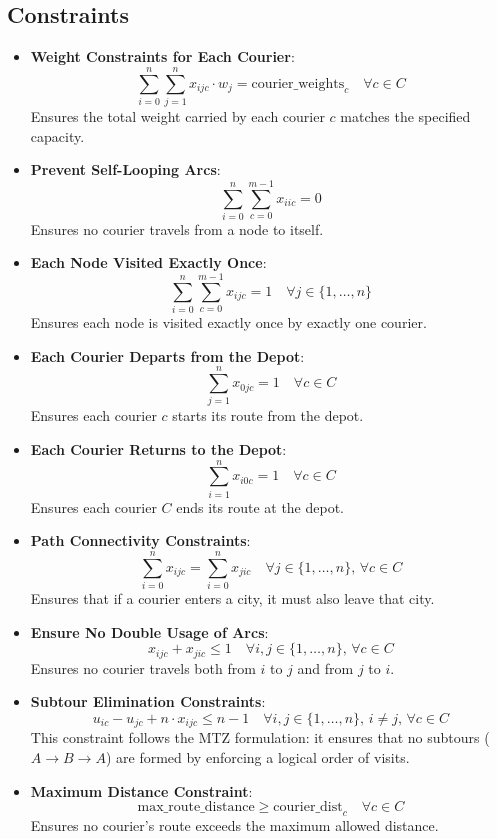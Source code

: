 \subsection{Constraints}

\begin{itemize}
 


   \item  \textbf{Weight Constraints for Each Courier}:
   \[
   \sum_{i=0}^n \sum_{j=1}^n x_{ijc} \cdot w_j
 = \text{courier\_weights}_c \quad \forall c \in C
   \]
   Ensures the total weight carried by each courier \( c \) matches the specified capacity.

\item  \textbf{Prevent Self-Looping Arcs}:
   \[
   \sum_{i=0}^n \sum_{c=0}^{m-1} x_{iic} = 0
   \]
   Ensures no courier travels from a node to itself.

\item  \textbf{Each Node Visited Exactly Once}:
   \[
   \sum_{i=0}^n \sum_{c=0}^{m-1} x_{ijc} = 1 \quad \forall j \in \{1, \dots, n\}
   \]
   Ensures each node is visited exactly once by exactly one courier.

\item  \textbf{Each Courier Departs from the Depot}:
   \[
   \sum_{j=1}^n x_{0jc} = 1 \quad \forall c \in C
   \]
   Ensures each courier \( c \) starts its route from the depot.

\item  \textbf{Each Courier Returns to the Depot}:
   \[
   \sum_{i=1}^n x_{i0c} = 1 \quad \forall c \in C
   \]
   Ensures each courier \( C \) ends its route at the depot.

\item  \textbf{Path Connectivity Constraints}:
   \[
   \sum_{i=0}^n x_{ijc} = \sum_{i=0}^n x_{jic} \quad \forall j \in \{1, \dots, n\}, \, \forall c \in C
   \]
   Ensures that if a courier enters a city, it must also leave that city.

\item  \textbf{Ensure No Double Usage of Arcs}:
   \[
   x_{ijc} + x_{jic} \leq 1 \quad \forall i, j \in \{1, \dots, n\}, \, \forall c \in C
   \]
   Ensures no courier travels both from \( i \) to \( j \) and from \( j \) to \( i \).

\item  \textbf{Subtour Elimination Constraints}:
   \[
   u_{ic} - u_{jc} + n \cdot x_{ijc} \leq n - 1 \quad \forall i, j \in \{1, \dots, n\}, \, i \neq j, \, \forall c \in C
   \]
   This constraint follows the MTZ formulation: it ensures that no subtours  ($A\xrightarrow{}B \xrightarrow{} A $) are formed by enforcing a logical order of visits.

\item  \textbf{Maximum Distance Constraint}:
    \[
    \text{max\_route\_distance} \geq \text{courier\_dist}_c \quad \forall c \in C
    \]
    Ensures no courier's route exceeds the maximum allowed distance.
\end{itemize}

